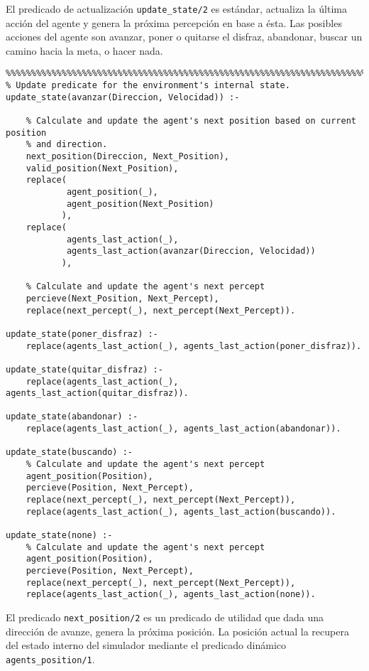 \documentclass[a4paper,12pt]{report}
\begin{document}
El predicado de actualizaci\'{o}n \texttt{update\_state/2} es est\'{a}ndar, actualiza la \'{u}ltima acci\'{o}n del agente
y genera la pr\'{o}xima percepci\'{o}n en base a \'{e}sta.
Las posibles acciones del agente son avanzar, poner o quitarse el disfraz, abandonar, buscar un camino hacia la meta, o
hacer nada.

\begin{verbatim}
%%%%%%%%%%%%%%%%%%%%%%%%%%%%%%%%%%%%%%%%%%%%%%%%%%%%%%%%%%%%%%%%%%%%%%%%%%%%%%%%
% Update predicate for the environment's internal state.
update_state(avanzar(Direccion, Velocidad)) :-

    % Calculate and update the agent's next position based on current position
    % and direction.
    next_position(Direccion, Next_Position),
    valid_position(Next_Position),
    replace(
            agent_position(_),
            agent_position(Next_Position)
           ),
    replace(
            agents_last_action(_),
            agents_last_action(avanzar(Direccion, Velocidad))
           ),

    % Calculate and update the agent's next percept
    percieve(Next_Position, Next_Percept),
    replace(next_percept(_), next_percept(Next_Percept)).

update_state(poner_disfraz) :-
    replace(agents_last_action(_), agents_last_action(poner_disfraz)).

update_state(quitar_disfraz) :-
    replace(agents_last_action(_), agents_last_action(quitar_disfraz)).

update_state(abandonar) :-
    replace(agents_last_action(_), agents_last_action(abandonar)).

update_state(buscando) :-
    % Calculate and update the agent's next percept
    agent_position(Position),
    percieve(Position, Next_Percept),
    replace(next_percept(_), next_percept(Next_Percept)),
    replace(agents_last_action(_), agents_last_action(buscando)).

update_state(none) :-
    % Calculate and update the agent's next percept
    agent_position(Position),
    percieve(Position, Next_Percept),
    replace(next_percept(_), next_percept(Next_Percept)),
    replace(agents_last_action(_), agents_last_action(none)).

\end{verbatim}

El predicado \texttt{next\_position/2} es un predicado de utilidad que dada una direcci\'{o}n de avanze, genera la
pr\'{o}xima posici\'{o}n.
La posici\'{o}n actual la recupera del estado interno del simulador mediante el predicado din\'{a}mico
\texttt{agents\_position/1}.
\end{document}
